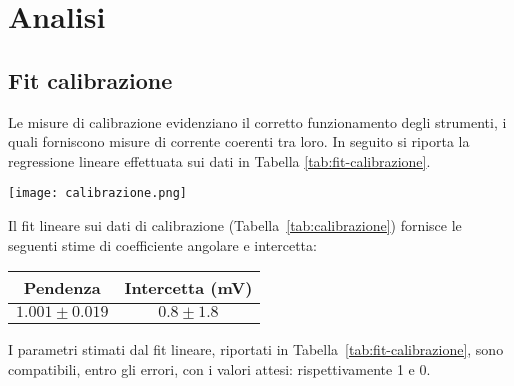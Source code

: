 \documentclass[@SRC@/main]{subfiles}
\begin{document}
\vspace{1.5 pt}


\section{Analisi}

  \subsection{Fit calibrazione}
    Le misure di calibrazione evidenziano il corretto funzionamento degli
    strumenti, i quali forniscono misure di corrente coerenti tra loro. In seguito
    si riporta la regressione lineare effettuata sui dati in Tabella \ref{tab:fit-calibrazione}.
    \vspace{1.5pt}
    \begin{center}
      \begin{minipage}{.8\textwidth}
        \centering
        \texttt{[image: calibrazione.png]}
        \label{fig:calibrazione}
      \end{minipage}
    \end{center}

    \newpage
    \vspace{1.5pt}
    \noindent Il fit lineare sui dati di calibrazione (Tabella~\ref{tab:calibrazione})
    fornisce le seguenti stime di coefficiente angolare e intercetta:

    \vspace{1.5pt}
    \begin{center}
      \begin{minipage}{.95\textwidth}
        \centering
        \begin{tabular}{||c|c||}
          \hline
          Pendenza          & Intercetta (mV) \\
          \hline
          $1.001 \pm 0.019$ & $0.8 \pm 1.8$   \\
          \hline
        \end{tabular}
        \label{tab:fit-calibrazione}
      \end{minipage}
    \end{center}
    \vspace{2pt}
    I parametri stimati dal fit lineare, riportati in Tabella~\ref{tab:fit-calibrazione},
    sono compatibili, entro gli errori, con i valori attesi: rispettivamente 1 e 0.
\end{document}
